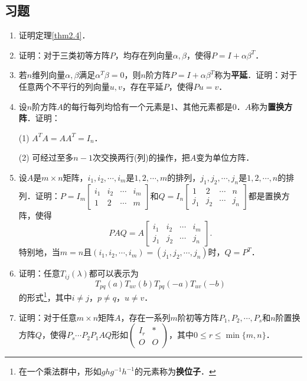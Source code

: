 \documentclass[a4paper,fontset=windows]{ctexbook}
\theoremstyle{definition}
\renewcommand{\le}{\leqslant}
\begin{document}
\subsection*{习题}

\begin{enumerate}
\item 证明定理\ref{thm2.4}．

\item 证明：对于三类初等方阵$P$，均存在列向量$\alpha,\beta$，使得$P=I+\alpha\beta^T$．

\item 若$n$维列向量$\alpha,\beta$满足$\alpha^T\beta=0$，则$n$阶方阵$P=I+\alpha\beta^T$称为{\bf 平延}．证明：对于任意两个不平行的列向量$u,v$，存在平延$P$，使得$Pu=v$．

\item 设$n$阶方阵$A$的每行每列均恰有一个元素是1、其他元素都是0．$A$称为{\bf 置换方阵}．证明：

(1) $A^TA=AA^T=I_n$．

(2) 可经过至多$n-1$次交换两行(列)的操作，把$A$变为单位方阵．

\item 设$A$是$m\times n$矩阵，$i_1,i_2,\cdots,i_m$是$1,2,\cdots,m$的排列，$j_1,j_2,\cdots,j_n$是$1,2,\cdots,n$的排列．证明：$P=I_m[\begin{smallmatrix}i_1&i_2&\cdots&i_m \\ 1&2&\cdots&m\end{smallmatrix}]$和$Q=I_n[\begin{smallmatrix}1&2&\cdots&n \\ j_1&j_2&\cdots&j_n\end{smallmatrix}]$都是置换方阵，使得
$$PAQ=A[\begin{smallmatrix}i_1&i_2&\cdots&i_m \\ j_1&j_2&\cdots&j_n\end{smallmatrix}].$$
特别地，当$m=n$且$(i_1,i_2,\cdots,i_m)=(j_1,j_2,\cdots,j_n)$时，$Q=P^T$．

\item 证明：任意$T_{ij}(\lambda)$都可以表示为
$$T_{pq}(a)T_{uv}(b)T_{pq}(-a)T_{uv}(-b)$$
的形式\footnote{在一个乘法群中，形如$ghg^{-1}h^{-1}$的元素称为{\bf 换位子}．}，其中$i\ne j$，$p\ne q$，$u\ne v$．

\item 证明：对于任意$m\times n$矩阵$A$，存在一系列$m$阶初等方阵$P_1,P_2,\cdots,P_s$和$n$阶置换方阵$Q$，使得$P_s\cdots P_2P_1AQ$形如$\begin{pmatrix}I_r&* \\ O&O\end{pmatrix}$，其中$0\le r\le\min\{m,n\}$．


\end{enumerate}
\end{document}
